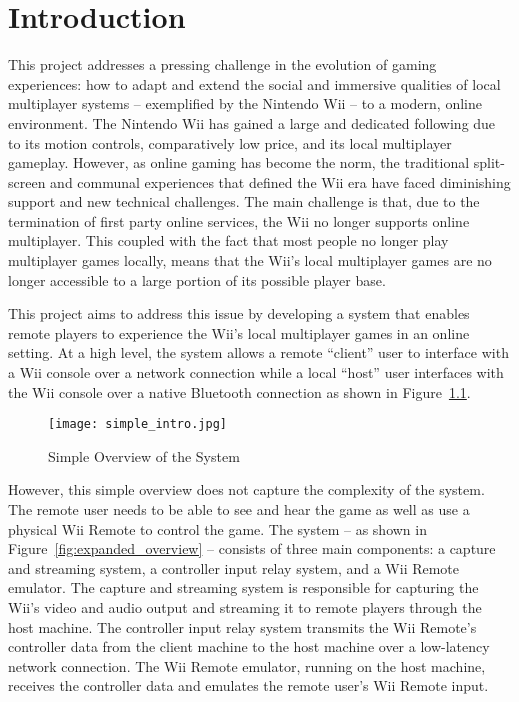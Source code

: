\chapter{Introduction}
\hypertarget{chapter:introduction}{}

This project addresses a pressing challenge in the evolution of gaming experiences: how to adapt and extend the social and immersive qualities of local multiplayer systems -- exemplified by the Nintendo Wii -- to a modern, online environment. The Nintendo Wii has gained a large and dedicated following due to its motion controls, comparatively low price, and its local multiplayer gameplay. However, as online gaming has become the norm\cite{businesswireOnlineGaming}, the traditional split-screen and communal experiences that defined the Wii era have faced diminishing support and new technical challenges. The main challenge is that, due to the termination of first party online services\cite{nintendoTerminationNintendo}, the Wii no longer supports online multiplayer. This coupled with the fact that most people no longer play multiplayer games locally\cite{academyofanimatedartOnlineGaming}, means that the Wii’s local multiplayer games are no longer accessible to a large portion of its possible player base.

This project aims to address this issue by developing a system that enables remote players to experience the Wii’s local multiplayer games in an online setting. At a high level, the system allows a remote ``client'' user to interface with a Wii console over a network connection while a local ``host'' user interfaces with the Wii console over a native Bluetooth connection as shown in Figure~\ref{fig:simple_overview}.

\begin{figure}[h]
	\centering
	\texttt{[image: simple\_intro.jpg]}
	\caption{Simple Overview of the System}
	\label{fig:simple_overview}
\end{figure}

However, this simple overview does not capture the complexity of the system. The remote user needs to be able to see and hear the game as well as use a physical Wii Remote to control the game. The system -- as shown in Figure~\ref{fig:expanded_overview} -- consists of three main components: a capture and streaming system, a controller input relay system, and a Wii Remote emulator. The capture and streaming system is responsible for capturing the Wii’s video and audio output and streaming it to remote players through the host machine. The controller input relay system transmits the Wii Remote’s controller data from the client machine to the host machine over a low-latency network connection. The Wii Remote emulator, running on the host machine, receives the controller data and emulates the remote user's Wii Remote input.


